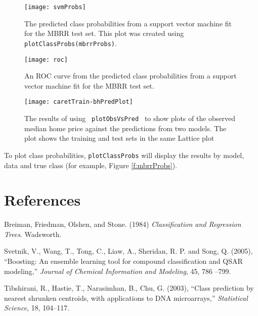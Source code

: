 \documentclass[12pt]{article}
\begin{document}
\begin{figure}[ht]
   \begin{center}      
      \texttt{[image: svmProbs]}   
      \caption{The predicted class probabilities from a support vector machine fit for the MBRR test set. This plot was created using \texttt{plotClassProbs(mbrrProbs)}.}
      \label{f:mbrrProbs}         
      \vspace*{.5 in}      
       \texttt{[image: roc]}   
      \caption{An ROC curve from the predicted class probabilities from a support vector machine fit for the MBRR test set. }
      \label{f:mbrrROC}       
   \end{center}
\end{figure}  

\begin{figure}
   \begin{center}      
\texttt{[image: caretTrain-bhPredPlot]}
      \caption{The results of using \texttt{ plotObsVsPred } to show plots of the observed median home price against the predictions from two models. The plot shows the training and test sets in the same Lattice plot}
      \label{f:bhPredPlot}         
   \end{center}
\end{figure}


To plot class probabilities, \texttt{plotClassProbs} will display the results by model, data and true class (for example, Figure \ref{f:mbrrProbs}).     

\section{References}

\begin{description}

   
   \item Breiman, Friedman, Olshen, and Stone. (1984) {\it Classification and Regression Trees}. Wadsworth.


   \item Svetnik, V., Wang, T., Tong, C., Liaw, A., Sheridan, R. P. and Song, Q. (2005), ``Boosting: An ensemble learning tool for compound classification and QSAR modeling,'' {\it Journal of Chemical Information and Modeling}, 45, 786 --799.
   
   \item Tibshirani, R., Hastie, T., Narasimhan, B., Chu, G. (2003), ``Class prediction by nearest shrunken centroids, with applications to DNA microarrays,'' {\it  Statistical Science}, 18, 104--117.


\end{description}
\end{document}
